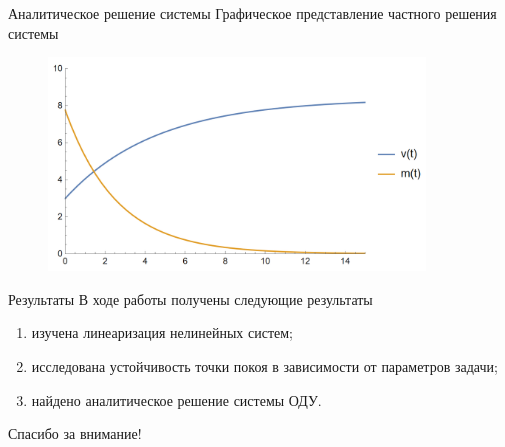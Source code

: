 \documentclass{beamer}
\begin{document}
	\begin{frame}{Аналитическое решение системы}
	Графическое представление частного решения системы
\begin{figure}[H]
	\centering
	\includegraphics[width=10cm]{graphic}
\end{figure}	
	\end{frame}
			\begin{frame}{Результаты}
				\Large
				В ходе работы получены следующие результаты
				\begin{block}{}
					\begin{enumerate}
						\Large
						\item изучена линеаризация нелинейных систем;
						\item исследована устойчивость точки покоя в зависимости от параметров задачи;
						\item найдено аналитическое решение системы ОДУ.
					\end{enumerate}
				\end{block}	
			\end{frame}	
		\begin{frame}
			\LARGE\center
			Спасибо за внимание!
		\end{frame}
		
\end{document}
